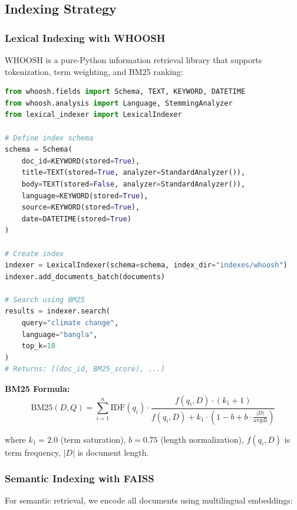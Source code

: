 \documentclass[12pt,a4paper]{report}
\begin{document}
\subsection{Indexing Strategy}

\subsubsection{Lexical Indexing with WHOOSH}

WHOOSH is a pure-Python information retrieval library that supports tokenization, term weighting, and BM25 ranking:

\begin{lstlisting}[language=Python, caption=BM25 Index Creation]
from whoosh.fields import Schema, TEXT, KEYWORD, DATETIME
from whoosh.analysis import Language, StemmingAnalyzer
from lexical_indexer import LexicalIndexer

# Define index schema
schema = Schema(
    doc_id=KEYWORD(stored=True),
    title=TEXT(stored=True, analyzer=StandardAnalyzer()),
    body=TEXT(stored=False, analyzer=StandardAnalyzer()),
    language=KEYWORD(stored=True),
    source=KEYWORD(stored=True),
    date=DATETIME(stored=True)
)

# Create index
indexer = LexicalIndexer(schema=schema, index_dir="indexes/whoosh")
indexer.add_documents_batch(documents)

# Search using BM25
results = indexer.search(
    query="climate change",
    language="bangla",
    top_k=10
)
# Returns: [(doc_id, BM25_score), ...]
\end{lstlisting}

\textbf{BM25 Formula:}
\begin{equation}
\text{BM25}(D, Q) = \sum_{i=1}^{n} \text{IDF}(q_i) \cdot \frac{f(q_i, D) \cdot (k_1 + 1)}{f(q_i, D) + k_1 \cdot (1 - b + b \cdot \frac{|D|}{\text{avgdl}})}
\end{equation}

where $k_1 = 2.0$ (term saturation), $b = 0.75$ (length normalization), $f(q_i, D)$ is term frequency, $|D|$ is document length.

\subsubsection{Semantic Indexing with FAISS}

For semantic retrieval, we encode all documents using multilingual embeddings:
\end{document}
